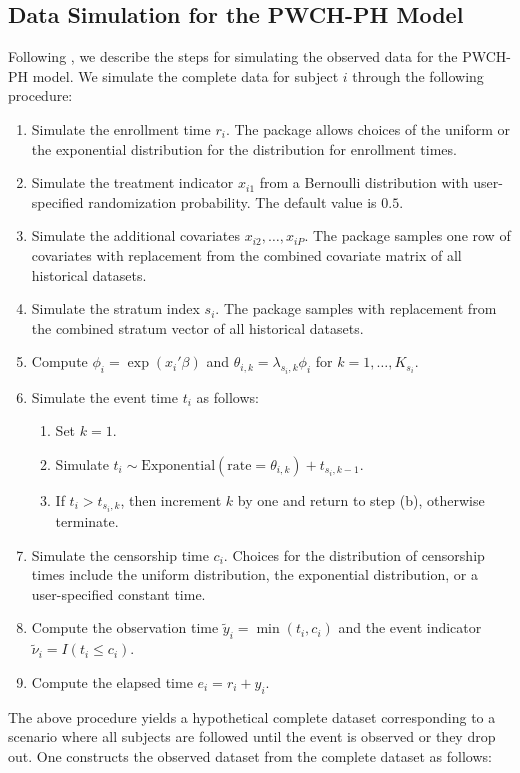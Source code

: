 \subsection{Data Simulation for the PWCH-PH Model }\label{data_sim}
Following \cite{psioda_adapt}, we describe the steps for simulating the observed data for the PWCH-PH model. We simulate the complete data for subject $i$ through the following procedure:
\begin{enumerate}
    \item Simulate the enrollment time $r_i$. The package allows choices of the uniform or the exponential distribution for the distribution for enrollment times.
    \item Simulate the treatment indicator $x_{i1}$ from a Bernoulli distribution with user-specified randomization probability. The default value is $0.5$.
    \item Simulate the additional covariates $x_{i2},\dots,x_{iP}$. The package samples one row of covariates with replacement from the combined covariate matrix of all historical datasets. 
    \item Simulate the stratum index $s_i$. The package samples with replacement from the combined stratum vector of all historical datasets. 
    \item Compute $\phi_i=\exp(x_i'\beta)$ and $\theta_{i,k}=\lambda_{s_i,k}\phi_i$ for $k=1,\dots,K_{s_i}$.
    \item Simulate the event time $t_i$ as follows:
    \begin{enumerate}
        \item Set $k=1$.
        \item Simulate $t_i \sim \text{Exponential}(\text{rate}=\theta_{i,k}) + t_{s_i, k-1}$.
        \item If $t_i > t_{s_i,k}$, then increment $k$ by one and return to step (b), otherwise terminate. 
    \end{enumerate}
    \item Simulate the censorship time $c_i$. Choices for the distribution of censorship times include the uniform distribution, the exponential distribution, or a user-specified constant time.
    \item Compute the observation time $\tilde{y}_i=\min(t_i,c_i)$ and the event indicator $\tilde{\nu}_i=I(t_i \le c_i)$.
    \item Compute the elapsed time $e_i=r_i+y_i$.
\end{enumerate}
The above procedure yields a hypothetical complete dataset corresponding to a scenario where all subjects are followed until the event is observed or they drop out. One constructs the observed dataset from the complete dataset as follows:  
